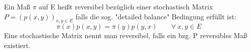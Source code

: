 Ein Maß $\pi$ auf E heißt reversibel bezüglich einer stochastisch Matrix $P = (p(x,y))_{x,y \in E}$ falls die sog. "detailed balance" Bedingung erfüllt ist:
\begin{equation*}
\pi(x)p(x,y) = \pi(y)p(y,x) \qquad \forall \: x,y \in E
\end{equation*}
Eine stochastische Matrix nennt man reversibel, falls ein bzg. P reversibles Maß existiert.